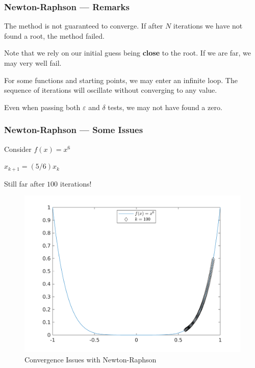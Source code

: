 \documentclass[11pt,xcolor={svgnames},aspectratio=169,usepdftitle=false]{beamer}
\let\toneitemize\itemize
\let\ttwoitemize\enditemize
\renewenvironment{itemize}{\toneitemize\addtolength{\itemsep}{0.7\baselineskip}}{\ttwoitemize}
\begin{document}
\begin{frame}
  \frametitle{Newton-Raphson --- Remarks}
\begin{itemize}
  \item The method is not guaranteed to converge. If after $N$ iterations we have not found a root, the method failed.
  \item Note that we rely on our initial guess being \alert{\textbf{close}} to the root. If we are far, we may very well fail.
  \item For some functions and starting points, we may enter an infinite loop. The sequence of iterations will oscillate without converging to any value.
  \item Even when passing both $\varepsilon$ and $\delta$ tests, we may not have found a zero.
\end{itemize}
\end{frame}

\begin{frame}[fragile]
  \frametitle{Newton-Raphson --- Some Issues} 
  \begin{minipage}[l]{0.39\textwidth}
  \begin{itemize}
    \item Consider $f(x) = x^6$
    \item $x_{k+1} = (5/6)x_k$
    \item Still far after $100$ iterations!
  \end{itemize}
  \end{minipage}
  \begin{minipage}[r]{0.6\textwidth}
    \begin{figure}
      \centering
      \includegraphics[width = \textwidth]{../figures/newton_convergence_issues.png}
      \caption{Convergence Issues with Newton-Raphson}
      \label{fig:newton_convergence}
    \end{figure}
\end{minipage}
\end{frame}
\end{document}
